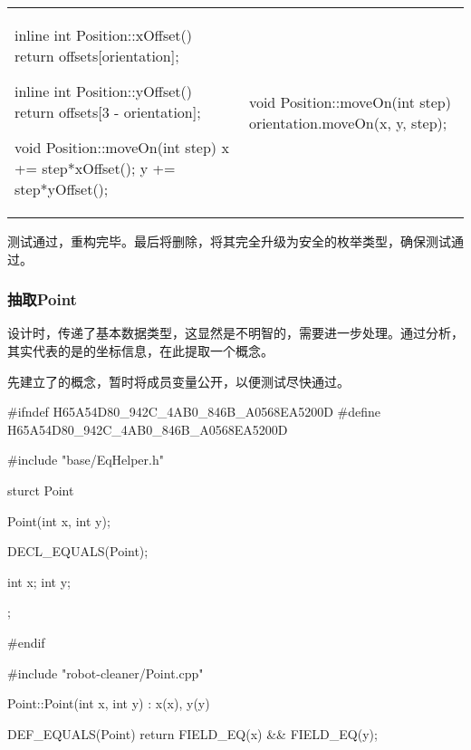\begin{content}
\begin{tabular}{@{}p{} 
                 | p{}@{}}
\begin{c++}[caption={src/robot-cleaner/Position.cpp}]
inline int Position::xOffset()
{ 
    return offsets[orientation]; 
}

inline int Position::yOffset()
{ 
    return offsets[3 - orientation]; 
}

void Position::moveOn(int step)
{
    x += step*xOffset();
    y += step*yOffset();
}
\end{c++}
&
\begin{c++}[caption={src/robot-cleaner/Position.cpp}]
void Position::moveOn(int step)
{
    orientation.moveOn(x, y, step);
}
\end{c++}
\end{tabular}

测试通过，重构完毕。最后将删除，将其完全升级为安全的枚举类型，确保测试通过。

\subsubsection{抽取Point}

设计时，传递了基本数据类型，这显然是不明智的，需要进一步处理。通过分析，其实代表的是的坐标信息，在此提取一个概念。

先建立了的概念，暂时将成员变量公开，以便测试尽快通过。

\begin{leftbar}
\begin{c++}[caption={include/robot-cleaner/Point.h}]
#ifndef H65A54D80_942C_4AB0_846B_A0568EA5200D
#define H65A54D80_942C_4AB0_846B_A0568EA5200D
    
#include "base/EqHelper.h"  
  
sturct Point
{
    Point(int x, int y);
    
    DECL_EQUALS(Point);
    
    int x;
    int y;
};

#endif
\end{c++}
\end{leftbar}

\begin{leftbar}
\begin{c++}[caption={src/robot-cleaner/Point.cpp}]
#include "robot-cleaner/Point.cpp"

Point::Point(int x, int y)
  : x(x), y(y)
{}

DEF_EQUALS(Point)
{
    return FIELD_EQ(x) && FIELD_EQ(y);
}

\end{c++}
\end{leftbar}


\end{content}
